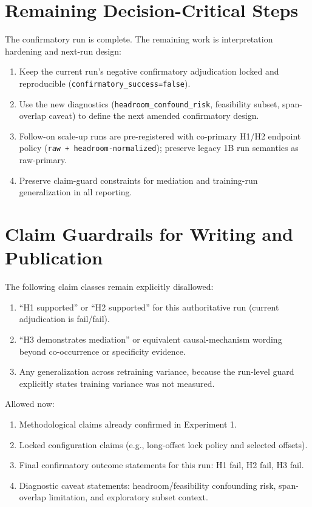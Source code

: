 \documentclass[11pt]{article}
\begin{document}
\section{Remaining Decision-Critical Steps}
The confirmatory run is complete. The remaining work is interpretation hardening and next-run design:
\begin{enumerate}[leftmargin=*]
  \item Keep the current run's negative confirmatory adjudication locked and reproducible (\texttt{confirmatory\_success=false}).
  \item Use the new diagnostics (\texttt{headroom\_confound\_risk}, feasibility subset, span-overlap caveat) to define the next amended confirmatory design.
  \item Follow-on scale-up runs are pre-registered with co-primary H1/H2 endpoint policy (\texttt{raw + headroom-normalized}); preserve legacy 1B run semantics as raw-primary.
  \item Preserve claim-guard constraints for mediation and training-run generalization in all reporting.
\end{enumerate}

\section{Claim Guardrails for Writing and Publication}
The following claim classes remain explicitly disallowed:
\begin{enumerate}[leftmargin=*]
  \item ``H1 supported'' or ``H2 supported'' for this authoritative run (current adjudication is fail/fail).
  \item ``H3 demonstrates mediation'' or equivalent causal-mechanism wording beyond co-occurrence or specificity evidence.
  \item Any generalization across retraining variance, because the run-level guard explicitly states training variance was not measured.
\end{enumerate}

Allowed now:
\begin{enumerate}[leftmargin=*]
  \item Methodological claims already confirmed in Experiment 1.
  \item Locked configuration claims (e.g., long-offset lock policy and selected offsets).
  \item Final confirmatory outcome statements for this run: H1 fail, H2 fail, H3 fail.
  \item Diagnostic caveat statements: headroom/feasibility confounding risk, span-overlap limitation, and exploratory subset context.
\end{enumerate}
\end{document}

